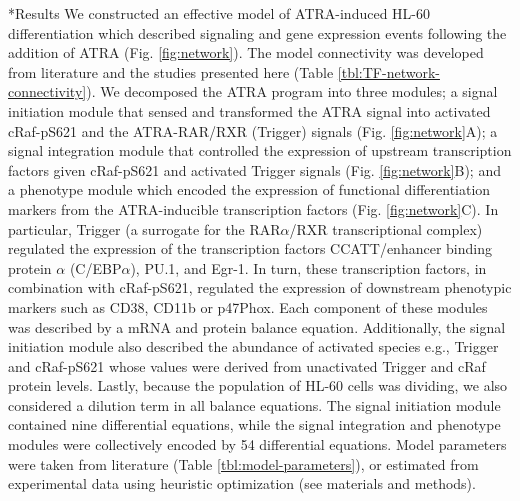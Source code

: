 \documentclass[12pt]{article}
\makeatletter
\renewcommand\section{\@startsection
	{subsection}{2}{0mm}
	{-0.2in}
	{0.05\baselineskip}
	{\normalfont\large\bfseries}}
\makeatother
\begin{document}
\clearpage

\section*{Results}
We constructed an effective model of ATRA-induced HL-60 differentiation which described signaling and gene expression events following the addition of ATRA (Fig. \ref{fig:network}).
The model connectivity was developed from literature and the studies presented here (Table \ref{tbl:TF-network-connectivity}).
We decomposed the ATRA program into three modules;
a signal initiation module that sensed and transformed the ATRA signal into activated cRaf-pS621 and the ATRA-RAR/RXR (Trigger) signals (Fig. \ref{fig:network}A);
a signal integration module that controlled the expression of upstream transcription factors given cRaf-pS621 and activated Trigger signals (Fig. \ref{fig:network}B); and
a phenotype module which encoded the expression of functional differentiation markers from the ATRA-inducible transcription factors (Fig. \ref{fig:network}C).
In particular, Trigger (a surrogate for the RAR$\alpha$/RXR transcriptional complex)
regulated the expression of the transcription factors CCATT/enhancer binding protein $\alpha$ (C/EBP$\alpha$), PU.1, and Egr-1.
In turn, these transcription factors, in combination with cRaf-pS621, regulated the expression of downstream phenotypic markers such as CD38, CD11b or p47Phox.
Each component of these modules was described by a mRNA and protein balance equation.
Additionally, the signal initiation module also described the abundance of activated species e.g., Trigger and cRaf-pS621 whose values were derived from
unactivated Trigger and cRaf protein levels.
Lastly, because the population of HL-60 cells was dividing, we also considered a dilution term in all balance equations.
The signal initiation module contained nine differential equations, while the signal integration and phenotype modules were collectively encoded by 54 differential equations.
Model parameters were taken from literature (Table \ref{tbl:model-parameters}), or estimated from experimental data using heuristic optimization (see materials and methods).
\end{document}
